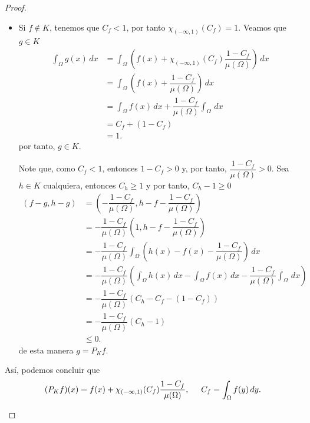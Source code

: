 \begin{proof}
\begin{enumerate}
\begin{enumerate}
\begin{itemize}
            \item Si $f\notin K$, tenemos que $C_f<1$, por tanto $\chi_{(-\infty,1)}(C_f)=1$. Veamos que $g \in K$
            \begin{align*}
                \int_{\Omega}g(x)\, dx&=\int_{\Omega}\left(f(x)+\chi_{(-\infty,1)}(C_f)\dfrac{1-C_f}{\mu(\Omega)}\right)\, dx\\
                &=\int_{\Omega}\left(f(x)+\dfrac{1-C_f}{\mu(\Omega)}\right)\, dx\\
                &=\int_{\Omega}f(x)\, dx+\dfrac{1-C_f}{\mu(\Omega)}\int_{\Omega}\, dx\\
                &=C_f+(1-C_f)\\
                &=1.
            \end{align*}
            por tanto, $g\in K$.
            
            Note que, como $C_f<1$, entonces $1-C_f>0$ y, por tanto, $\dfrac{1-C_f}{\mu(\Omega)}>0$. Sea $h \in K$ cualquiera, entonces $C_h\geq 1$ y por tanto, $C_h-1\geq 0$
            \begin{align*}
                (f-g,h-g)&=\left(-\dfrac{1-C_f}{\mu(\Omega)},h-f-\dfrac{1-C_f}{\mu(\Omega)}\right)\\
                &=-\dfrac{1-C_f}{\mu(\Omega)}\left(1,h-f-\dfrac{1-C_f}{\mu(\Omega)}\right)\\
                &=-\dfrac{1-C_f}{\mu(\Omega)}\int_{\Omega}\left(h(x)-f(x)-\dfrac{1-C_f}{\mu(\Omega)}\right)\, dx\\
                &=-\dfrac{1-C_f}{\mu(\Omega)}\left(\int_{\Omega}h(x)\, dx-\int_{\Omega}f(x)\, dx-\dfrac{1-C_f}{\mu(\Omega)}\int_{\Omega}\, dx\right)\\
                &=-\dfrac{1-C_f}{\mu(\Omega)}(C_h-C_f-(1-C_f))\\
                &=-\dfrac{1-C_f}{\mu(\Omega)}(C_h-1)\\
                &\leq 0.
            \end{align*}
            de esta manera $g=P_K f$.
        \end{itemize}
        Así, podemos concluir que 
        \begin{align*}
            (P_K f)(x)=f(x)+\chi_{(-\infty,1)}(C_f)\dfrac{1-C_f}{\mu(\Omega)}, \hspace{5mm} C_f=\int_{\Omega}f(y)\, dy.
        \end{align*}
        \end{enumerate}
    \end{enumerate}
    \end{proof}


